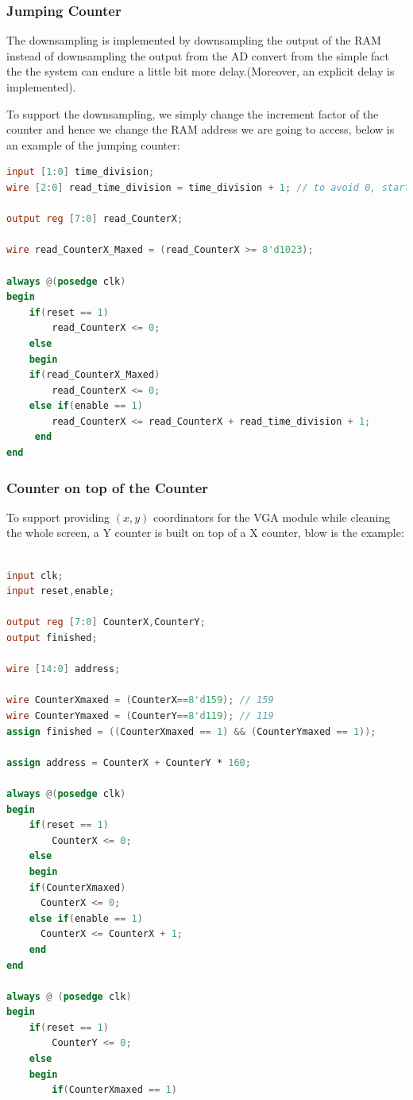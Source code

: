 \documentclass[11pt]{scrartcl}
\begin{document}
\subsubsection{Jumping Counter}
\label{sec:jumcount}

The downsampling is implemented by downsampling the output of the RAM instead of downsampling the output from the AD convert from the simple fact the the system can endure a little bit more delay.(Moreover, an explicit delay is implemented).

To support the downsampling, we simply change the increment factor of the counter and hence we change the RAM address we are going to access, below is an example of the jumping counter:
 
\begin{lstlisting}[language=Verilog]
input [1:0] time_division;
wire [2:0] read_time_division = time_division + 1; // to avoid 0, start from 1

output reg [7:0] read_CounterX;

wire read_CounterX_Maxed = (read_CounterX >= 8'd1023);

always @(posedge clk)
begin
	if(reset == 1)
		read_CounterX <= 0;
	else
	begin
	if(read_CounterX_Maxed)
	  	read_CounterX <= 0;
	else if(enable == 1)
	  	read_CounterX <= read_CounterX + read_time_division + 1;
	 end
end
\end{lstlisting}
\subsubsection{Counter on top of the Counter}
\label{sec:coucount}

To support providing $(x,y)$ coordinators for the VGA module while cleaning the whole screen, a Y counter is built on top of a X counter, blow is the example:
\begin{lstlisting}[language=Verilog]

input clk;
input reset,enable;

output reg [7:0] CounterX,CounterY;
output finished;

wire [14:0] address;

wire CounterXmaxed = (CounterX==8'd159); // 159
wire CounterYmaxed = (CounterY==8'd119); // 119
assign finished = ((CounterXmaxed == 1) && (CounterYmaxed == 1));

assign address = CounterX + CounterY * 160;

always @(posedge clk)
begin
	if(reset == 1)
		CounterX <= 0;
	else
	begin
	if(CounterXmaxed)
	  CounterX <= 0;
	else if(enable == 1)
	  CounterX <= CounterX + 1;
	end
end

always @ (posedge clk)
begin
	if(reset == 1)
		CounterY <= 0;
	else
	begin
		if(CounterXmaxed == 1)
\end{lstlisting}
\end{document}
